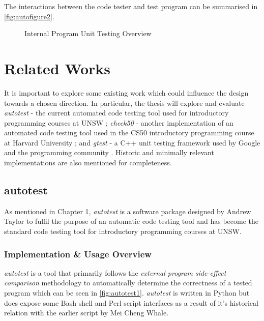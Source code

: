 \documentclass[hidelinks, 12pt]{extreport}
\newcommand{\unchapter}[2]{
    \setcounter{chapter}{#1}
    \setcounter{section}{0}
    \chapter*{#2}
    \addcontentsline{toc}{chapter}{#2}
}
\begin{document}
The interactions between the code tester and test program can be summarised in \autoref{fig:autofigure2}.

\begin{figure}[h]
	\centering
	\caption{Internal Program Unit Testing Overview}
	\label{fig:autofigure2}
\end{figure}

\unchapter{3}{Related Works}

It is important to explore some existing work which could influence the design towards a chosen direction. In particular, the thesis will explore and evaluate \textit{autotest} - the current automated code testing tool used for introductory programming courses at UNSW \cite{Autotest}; \textit{check50} - another implementation of an automated code testing tool used in the CS50 introductory programming course at Harvard University \cite{check50}; and \textit{gtest} - a C++ unit testing framework used by Google and the programming community \cite{gtest}. Historic and minimally relevant implementations are also mentioned for completeness. 

\section{autotest}

As mentioned in Chapter 1, \textit{autotest} is a software package designed by Andrew Taylor to fulfil the purpose of an automatic code testing tool and has become the standard code testing tool for introductory programming courses at UNSW.

\subsection{Implementation \& Usage Overview}

\textit{autotest} is a tool that primarily follows the \textit{external program side-effect comparison} methodology to automatically determine the correctness of a tested program which can be seen in \autoref{fig:autotest1}. \textit{autotest} is written in Python but does expose some Bash shell and Perl script interfaces as a result of it's historical relation with the earlier script by Mei Cheng Whale.
\end{document}
